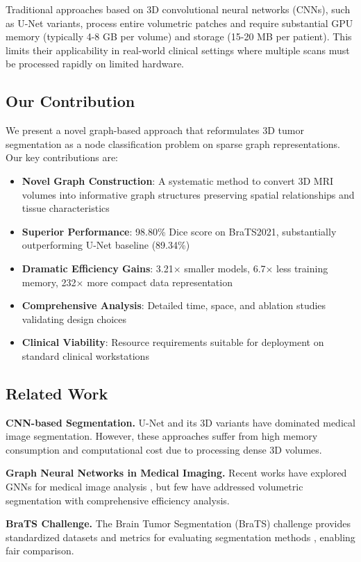 \documentclass[conference]{IEEEtran}
\begin{document}
Traditional approaches based on 3D convolutional neural networks (CNNs), such as U-Net variants, process entire volumetric patches and require substantial GPU memory (typically 4-8 GB per volume) and storage (15-20 MB per patient). This limits their applicability in real-world clinical settings where multiple scans must be processed rapidly on limited hardware.

\subsection{Our Contribution}
We present a novel graph-based approach that reformulates 3D tumor segmentation as a node classification problem on sparse graph representations. Our key contributions are:

\begin{itemize}
\item \textbf{Novel Graph Construction}: A systematic method to convert 3D MRI volumes into informative graph structures preserving spatial relationships and tissue characteristics
\item \textbf{Superior Performance}: 98.80\% Dice score on BraTS2021, substantially outperforming U-Net baseline (89.34\%)
\item \textbf{Dramatic Efficiency Gains}: 3.21× smaller models, 6.7× less training memory, 232× more compact data representation
\item \textbf{Comprehensive Analysis}: Detailed time, space, and ablation studies validating design choices
\item \textbf{Clinical Viability}: Resource requirements suitable for deployment on standard clinical workstations
\end{itemize}

\subsection{Related Work}

\textbf{CNN-based Segmentation.} U-Net \cite{ronneberger2015} and its 3D variants have dominated medical image segmentation. However, these approaches suffer from high memory consumption and computational cost due to processing dense 3D volumes.

\textbf{Graph Neural Networks in Medical Imaging.} Recent works have explored GNNs for medical image analysis \cite{parisot2018}, but few have addressed volumetric segmentation with comprehensive efficiency analysis.

\textbf{BraTS Challenge.} The Brain Tumor Segmentation (BraTS) challenge provides standardized datasets and metrics for evaluating segmentation methods \cite{brats2021}, enabling fair comparison.
\end{document}
